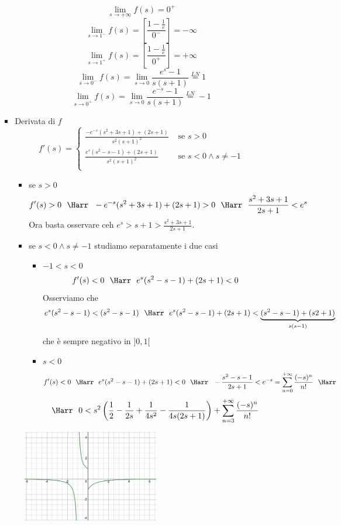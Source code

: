 \documentclass{article}
\newcommand{\se}{\text{ se }}
\begin{document}
\begin{enumerate}[label=\textbf{Esercizio 12.\arabic*.},itemindent=*]
\begin{enumerate}
\begin{itemize}
        \[\lim_{s\to +\infty}f(s)=0^+\]
        \[\lim_{s\to1^-}f(s)=\left[ \frac{1-\frac{1}{e}}{0^-} \right]=-\infty\]
        \[\lim_{s\to1^+}f(s)=\left[ \frac{1-\frac{1}{e}}{0^+} \right]=+\infty\]
        \[\lim_{s\to0^-}f(s)=\lim_{s\to 0}\frac{e^s-1}{s(s+1)}\stackrel{LN}{=}1\]
        \[\lim_{s\to0^+}f(s)=\lim_{s\to 0}\frac{e^{-s}-1}{s(s+1)}\stackrel{LN}{=}-1\]
        \item Derivata di $f$
        \[f'(s)=\begin{cases}
            \frac{-e^{-s}(s^2+3s+1)+(2s+1)}{s^2(s+1)^2}&\se s>0\\
            \frac{e^{s}(s^2-s-1)+(2s+1)}{s^2(s+1)^2}&\se s<0 \land s \neq - 1\\
        \end{cases}\]
        \begin{itemize}
            \item se $s>0$
            \[f'(s) >0~~\Harr~~-e^{-s}(s^2+3s+1)+(2s+1)>0~~\Harr~~\frac{s^2+3s+1}{2s+1}<e^s\]
            Ora basta osservare ceh $e^s>s+1>\frac{s^2+3s+1}{2s+1}$.
            \item se $s<0 \land s\neq -1$ studiamo separatamente i due casi
            \begin{itemize}
                \item $-1<s<0$
                \[f'(s)<0~~\Harr~~e^s(s^2-s-1)+(2s+1)<0\]
                Osserviamo che \[e^s(s^2-s-1)<(s^2-s-1)~~\Harr~~e^s(s^2-s-1)+(2s+1)<\underbrace{(s^2-s-1)+(s2+1)}_{s(s-1)}\]
                che è sempre negativo in $]0,1[$
                \item $s<0$
                \[f'(s)<0~~\Harr~~e^{s}(s^2-s-1)+(2s+1)<0~~\Harr~~-\frac{s^2-s-1}{2s+1}<e^{-s}=\sum_{n=0}^{+\infty}\frac{(-s)^n}{n!}~~\Harr\]
                \[\Harr~~0<s^2\left(\frac{1}{2}-\frac{1}{2s}+\frac{1}{4s^2}-\frac{1}{4s(2s+1)}\right)+\sum_{n=3}^{+\infty}\frac{(-s)^n}{n!}\]
            \end{itemize}
        \end{itemize}
    \end{itemize}
    \begin{figure}[ht]
        \centering
        \includegraphics[width=0.6\textwidth]{src/disegno1.png}

\end{figure}
\end{enumerate}
\end{enumerate}
\end{document}
